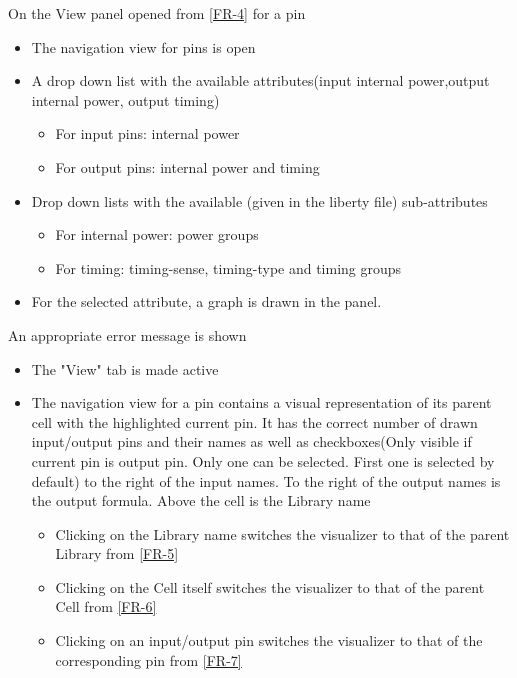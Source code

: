 \documentclass[10pt,a4paper]{report}
\begin{document}
\begin{FR}
    {On the View panel opened from \ref{FR-4} for a pin
        \begin{itemize}
            \item The navigation view for pins is open
            \item A drop down list with the available attributes(input internal power,output internal power, output timing)
            \begin{itemize}
                \item For input pins: internal power
                \item For output pins: internal power and timing
            \end{itemize}
            \item Drop down lists with the available (given in the liberty file) sub-attributes
            \begin{itemize}
                \item For internal power: power groups
                \item For timing: timing-sense, timing-type and timing groups
            \end{itemize}
            \item For the selected attribute, a graph is drawn in the panel.
        \end{itemize}}
    {An appropriate error message is shown}
    {\begin{itemize}
        \item The "View" tab is made active
    \end{itemize}}
    {\begin{itemize}
        \item The navigation view for a pin contains a visual representation of its parent cell with the highlighted current pin. It has the correct number of drawn input/output pins and their names as well as checkboxes(Only visible if current pin is output pin. Only one can be selected. First one is selected by default) to the right of the input names. To the right of the output names is the output formula. Above the cell is the Library name
        \begin{itemize}
            \item Clicking on the Library name switches the visualizer to that of the parent Library from \ref{FR-5}
            \item Clicking on the Cell itself switches the visualizer to that of the parent Cell from \ref{FR-6}
            \item Clicking on an input/output pin switches the visualizer to that of the corresponding pin from \ref{FR-7}

\end{itemize}
\end{itemize}}
\end{FR}
\end{document}
